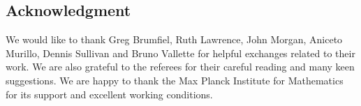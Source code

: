 
\subsection*{Acknowledgment}

We would like to thank Greg Brumfiel, Ruth Lawrence, John Morgan, Aniceto Murillo, Dennis Sullivan and Bruno Vallette for helpful exchanges related to their work.
We are also grateful to the referees for their careful reading and many keen suggestions.
We are happy to thank the Max Planck Institute for Mathematics for its support and excellent working conditions.